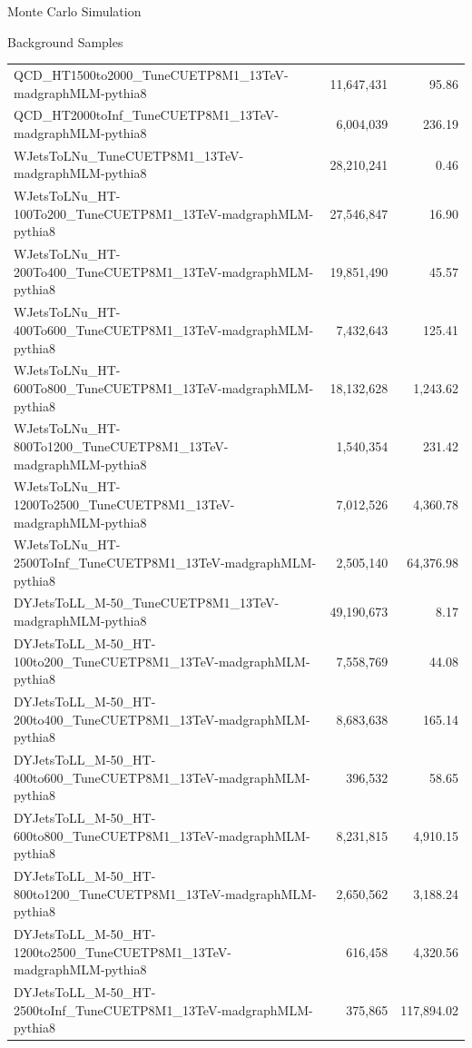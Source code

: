 \begin{section}{Monte Carlo Simulation}
\begin{subsection}{Background Samples}
\begin{table}
{\begin{tabular}[tbp!]{ l rr}
QCD\_HT1500to2000\_TuneCUETP8M1\_13TeV-madgraphMLM-pythia8                    &  11,647,431  &  95.86      \\
QCD\_HT2000toInf\_TuneCUETP8M1\_13TeV-madgraphMLM-pythia8                     &  6,004,039   &  236.19     \\
\hline
WJetsToLNu\_TuneCUETP8M1\_13TeV-madgraphMLM-pythia8                           &  28,210,241  &  0.46       \\
WJetsToLNu\_HT-100To200\_TuneCUETP8M1\_13TeV-madgraphMLM-pythia8              &  27,546,847  &  16.90      \\
WJetsToLNu\_HT-200To400\_TuneCUETP8M1\_13TeV-madgraphMLM-pythia8              &  19,851,490  &  45.57      \\
WJetsToLNu\_HT-400To600\_TuneCUETP8M1\_13TeV-madgraphMLM-pythia8              &  7,432,643   &  125.41     \\
WJetsToLNu\_HT-600To800\_TuneCUETP8M1\_13TeV-madgraphMLM-pythia8              &  18,132,628  &  1,243.62   \\
WJetsToLNu\_HT-800To1200\_TuneCUETP8M1\_13TeV-madgraphMLM-pythia8             &  1,540,354   &  231.42     \\
WJetsToLNu\_HT-1200To2500\_TuneCUETP8M1\_13TeV-madgraphMLM-pythia8            &  7,012,526   &  4,360.78   \\
WJetsToLNu\_HT-2500ToInf\_TuneCUETP8M1\_13TeV-madgraphMLM-pythia8             &  2,505,140   &  64,376.98  \\
\hline
DYJetsToLL\_M-50\_TuneCUETP8M1\_13TeV-madgraphMLM-pythia8                     &  49,190,673  &  8.17       \\
DYJetsToLL\_M-50\_HT-100to200\_TuneCUETP8M1\_13TeV-madgraphMLM-pythia8        &  7,558,769   &  44.08      \\
DYJetsToLL\_M-50\_HT-200to400\_TuneCUETP8M1\_13TeV-madgraphMLM-pythia8        &  8,683,638   &  165.14     \\
DYJetsToLL\_M-50\_HT-400to600\_TuneCUETP8M1\_13TeV-madgraphMLM-pythia8        &  396,532     &  58.65      \\
DYJetsToLL\_M-50\_HT-600to800\_TuneCUETP8M1\_13TeV-madgraphMLM-pythia8        &  8,231,815   &  4,910.15   \\
DYJetsToLL\_M-50\_HT-800to1200\_TuneCUETP8M1\_13TeV-madgraphMLM-pythia8       &  2,650,562   &  3,188.24   \\
DYJetsToLL\_M-50\_HT-1200to2500\_TuneCUETP8M1\_13TeV-madgraphMLM-pythia8      &  616,458     &  4,320.56   \\
DYJetsToLL\_M-50\_HT-2500toInf\_TuneCUETP8M1\_13TeV-madgraphMLM-pythia8       &  375,865     &  117,894.02 \\

\end{tabular}}
\end{table}
\end{subsection}
\end{section}
